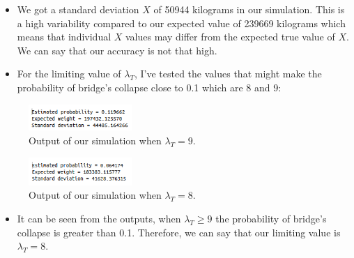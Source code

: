 \documentclass[12pt]{article}
\begin{document}
\begin{itemize}
    \item We got a standard deviation $X$ of 50944 kilograms in our simulation. This is a high variability compared to our expected value of 239669 kilograms which means that individual $X$ values may differ from the expected true value of $X$. We can say that our accuracy is not that high.
    \item For the limiting value of $\lambda_T$, I've tested the values that might make the probability of bridge’s collapse close to 0.1 which are 8 and 9:
\end{itemize}
\begin{figure}[H]
    \centering
    \includegraphics[width=0.35\textwidth]{code_and_output/image2.png}
    \caption{Output of our simulation when $\lambda_T = 9$.}
    \label{fig:example_b}
\end{figure}
\begin{figure}[H]
    \centering
    \includegraphics[width=0.35\textwidth]{code_and_output/image3.png}
    \caption{Output of our simulation when $\lambda_T = 8$.}
    \label{fig:example_b}
\end{figure}
\begin{itemize}
    \item It can be seen from the outputs, when $\lambda_T \geq 9$ the probability of bridge’s collapse is greater than 0.1. Therefore, we can say that our limiting value is $\lambda_T = 8$.
\end{itemize}
\end{document}
